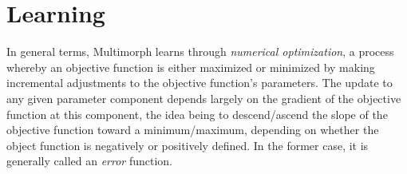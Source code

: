\section{Learning}
\label{sec:mcmm-learning}

%

In general terms, Multimorph learns through \emph{numerical optimization}, 
a process whereby an objective function is either maximized or minimized by 
making incremental adjustments to the objective function's parameters. The 
update to any given parameter component depends largely on the gradient 
of the objective function at this component, the idea being to descend/ascend 
the slope of the objective function toward a minimum/maximum, depending 
on whether the object function is negatively or positively defined. In the former case, 
it is generally called an \emph{error} function. 

